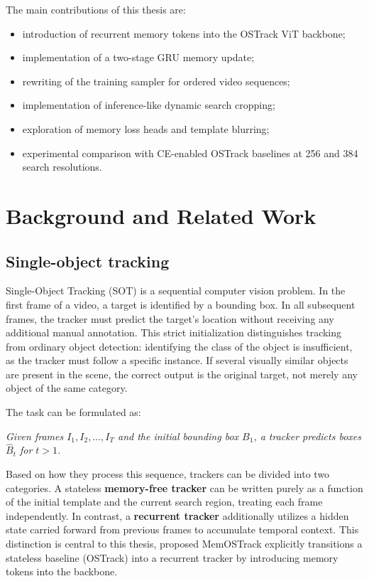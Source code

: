 \documentclass[bachelorthesis]{fer}
\numberwithin{equation}{chapter}
\providecommand{\tightlist}{%
    \setlength{\itemsep}{0pt}\setlength{\parskip}{0pt}}
\begin{document}
    The main contributions of this thesis are:

    \begin{itemize}
        \tightlist
        \item
        introduction of recurrent memory tokens into the OSTrack ViT backbone;
        \item
        implementation of a two-stage GRU memory update;
        \item
        rewriting of the training sampler for ordered video sequences;
        \item
        implementation of inference-like dynamic search cropping;
        \item
        exploration of memory loss heads and template blurring;
        \item
        experimental comparison with CE-enabled OSTrack baselines at 256 and 384 search
        resolutions.
    \end{itemize}


    \chapter{Background and Related Work}\label{background-and-related-work}


    \section{Single-object tracking}\label{single-object-tracking}

    Single-Object Tracking (SOT) is a sequential computer vision problem. In the first frame of a video, a target is identified by a bounding box. In all subsequent frames, the tracker must predict the target's location without receiving any additional manual annotation. This strict initialization distinguishes tracking from ordinary object detection: identifying the class of the object is insufficient, as the tracker must follow a specific instance. If several visually similar objects are present in the scene, the correct output is the original target, not merely any object of the same category.

    The task can be formulated as:

    \emph{Given frames \(I_1, I_2, \ldots, I_T\) and the initial bounding box \(B_1\), a tracker predicts boxes \(\hat{B}_t\) for \(t > 1\).}

    Based on how they process this sequence, trackers can be divided into two categories. A stateless \textbf{memory-free tracker} can be written purely as a function of the initial template and the current search region, treating each frame independently. In contrast, a \textbf{recurrent tracker} additionally utilizes a hidden state carried forward from previous frames to accumulate temporal context. This distinction is central to this thesis, proposed MemOSTrack explicitly transitions a stateless baseline (OSTrack) into a recurrent tracker by introducing memory tokens into the backbone.
\end{document}

